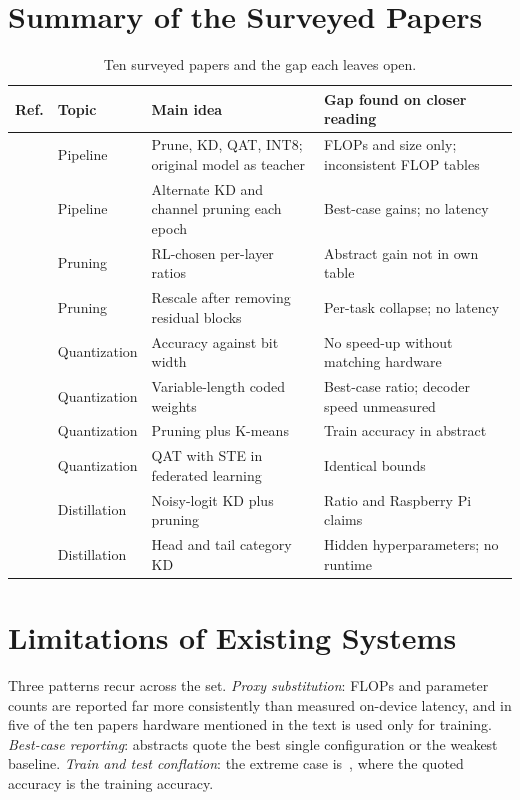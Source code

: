 \documentclass[oneside,a4paper,12pt]{report}
\begin{document}
\section{Summary of the Surveyed Papers}
\begin{table}[!htbp]
\centering
\small
\begin{tabularx}{\textwidth}{@{}l l X X@{}}
\toprule
Ref. & Topic & Main idea & Gap found on closer reading\\
\midrule
\cite{chae2026} & Pipeline & Prune, KD, QAT, INT8; original model as teacher & FLOPs and size only; inconsistent FLOP tables\\
\cite{wang2025} & Pipeline & Alternate KD and channel pruning each epoch & Best-case gains; no latency\\
\cite{he2018} & Pruning & RL-chosen per-layer ratios & Abstract gain not in own table\\
\cite{zhou2026} & Pruning & Rescale after removing residual blocks & Per-task collapse; no latency\\
\cite{chen2021} & Quantization & Accuracy against bit width & No speed-up without matching hardware\\
\cite{abdelsalam2025} & Quantization & Variable-length coded weights & Best-case ratio; decoder speed unmeasured\\
\cite{khan2025} & Quantization & Pruning plus K-means & Train accuracy in abstract\\
\cite{fang2026} & Quantization & QAT with STE in federated learning & Identical bounds\\
\cite{chen2020} & Distillation & Noisy-logit KD plus pruning & Ratio and Raspberry Pi claims\\
\cite{xu2024} & Distillation & Head and tail category KD & Hidden hyperparameters; no runtime\\
\bottomrule
\end{tabularx}
\caption{Ten surveyed papers and the gap each leaves open.}
\label{tab:survey}
\end{table}

\section{Limitations of Existing Systems}
Three patterns recur across the set. \emph{Proxy substitution}: FLOPs and parameter counts are reported far more consistently than measured on-device latency, and in five of the ten papers hardware mentioned in the text is used only for training. \emph{Best-case reporting}: abstracts quote the best single configuration or the weakest baseline. \emph{Train and test conflation}: the extreme case is~\cite{khan2025}, where the quoted accuracy is the training accuracy.
\end{document}
